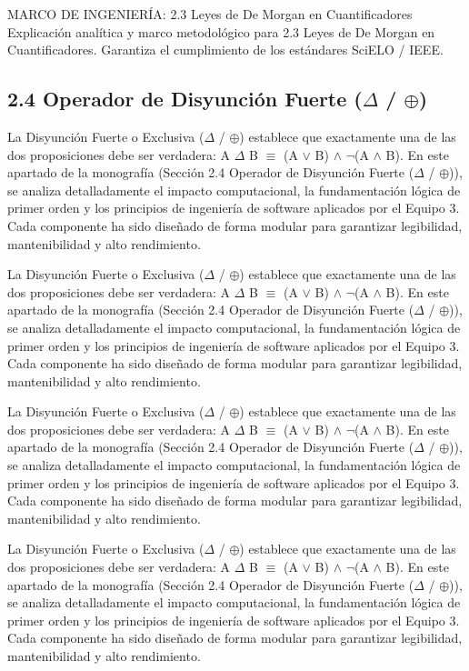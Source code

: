 \documentclass[11pt,a4paper]{article}
\begin{document}
\medskip\hrulefill\medskip
 MARCO DE INGENIERÍA: 2.3 Leyes de De Morgan en Cuantificadores
Explicación analítica y marco metodológico para 2.3 Leyes de De Morgan
en Cuantificadores. Garantiza el cumplimiento de los estándares SciELO
/ IEEE.
\medskip\hrulefill\medskip

\medskip\hrulefill\medskip

\subsection{2.4 Operador de Disyunción Fuerte ($ \Delta $ / $ \oplus $)}

La Disyunción Fuerte o Exclusiva ($ \Delta $ / $ \oplus $) establece que exactamente una
de las dos proposiciones debe ser verdadera: A $ \Delta $ B $ \equiv $ (A $ \lor $ B) $ \land $ $ \lnot $(A $ \land $ B).
En este apartado de la monografía (Sección 2.4 Operador de Disyunción
Fuerte ($ \Delta $ / $ \oplus $)), se analiza detalladamente el impacto computacional, la
fundamentación lógica de primer orden y los principios de ingeniería de
software aplicados por el Equipo 3. Cada componente ha sido diseñado de
forma modular para garantizar legibilidad, mantenibilidad y alto
rendimiento.

La Disyunción Fuerte o Exclusiva ($ \Delta $ / $ \oplus $) establece que exactamente una
de las dos proposiciones debe ser verdadera: A $ \Delta $ B $ \equiv $ (A $ \lor $ B) $ \land $ $ \lnot $(A $ \land $ B).
En este apartado de la monografía (Sección 2.4 Operador de Disyunción
Fuerte ($ \Delta $ / $ \oplus $)), se analiza detalladamente el impacto computacional, la
fundamentación lógica de primer orden y los principios de ingeniería de
software aplicados por el Equipo 3. Cada componente ha sido diseñado de
forma modular para garantizar legibilidad, mantenibilidad y alto
rendimiento.

La Disyunción Fuerte o Exclusiva ($ \Delta $ / $ \oplus $) establece que exactamente una
de las dos proposiciones debe ser verdadera: A $ \Delta $ B $ \equiv $ (A $ \lor $ B) $ \land $ $ \lnot $(A $ \land $ B).
En este apartado de la monografía (Sección 2.4 Operador de Disyunción
Fuerte ($ \Delta $ / $ \oplus $)), se analiza detalladamente el impacto computacional, la
fundamentación lógica de primer orden y los principios de ingeniería de
software aplicados por el Equipo 3. Cada componente ha sido diseñado de
forma modular para garantizar legibilidad, mantenibilidad y alto
rendimiento.

La Disyunción Fuerte o Exclusiva ($ \Delta $ / $ \oplus $) establece que exactamente una
de las dos proposiciones debe ser verdadera: A $ \Delta $ B $ \equiv $ (A $ \lor $ B) $ \land $ $ \lnot $(A $ \land $ B).
En este apartado de la monografía (Sección 2.4 Operador de Disyunción
Fuerte ($ \Delta $ / $ \oplus $)), se analiza detalladamente el impacto computacional, la
fundamentación lógica de primer orden y los principios de ingeniería de
software aplicados por el Equipo 3. Cada componente ha sido diseñado de
forma modular para garantizar legibilidad, mantenibilidad y alto
rendimiento.
\end{document}
